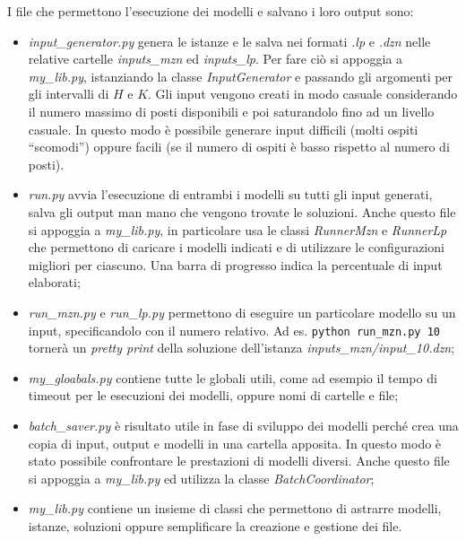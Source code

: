 \noindent
I file che permettono l'esecuzione dei modelli e salvano i loro output sono:
\begin{itemize}
  \item \emph{input\_generator.py} genera le istanze e le salva nei formati \emph{.lp} e \emph{.dzn} nelle relative cartelle \emph{inputs\_mzn} ed \emph{inputs\_lp}.
    Per fare ciò si appoggia a \emph{my\_lib.py}, istanziando la classe \emph{InputGenerator} e passando gli argomenti per gli intervalli di $H$ e $K$.
    Gli input vengono creati in modo casuale considerando il numero massimo di posti disponibili e poi saturandolo fino ad un livello casuale.
    In questo modo è possibile generare input difficili (molti ospiti ``scomodi'') oppure facili (se il numero di ospiti è basso rispetto al numero di posti).

  \item \emph{run.py} avvia l'esecuzione di entrambi i modelli su tutti gli input generati, salva gli output man mano che vengono trovate le soluzioni.
    Anche questo file si appoggia a \emph{my\_lib.py}, in particolare usa le classi \emph{RunnerMzn} e \emph{RunnerLp} che permettono di caricare i modelli indicati e di utilizzare le configurazioni migliori per ciascuno.
    Una barra di progresso indica la percentuale di input elaborati;

  \item \emph{run\_mzn.py} e \emph{run\_lp.py} permettono di eseguire un particolare modello su un input, specificandolo con il numero relativo. Ad es. \lstinline{python run_mzn.py 10} tornerà un \emph{pretty print} della soluzione dell'istanza \emph{inputs\_mzn/input\_10.dzn};

  \item \emph{my\_gloabals.py} contiene tutte le globali utili, come ad esempio il tempo di timeout per le esecuzioni dei modelli, oppure nomi di cartelle e file;

  \item \emph{batch\_saver.py} è risultato utile in fase di sviluppo dei modelli perché crea una copia di input, output e modelli in una cartella apposita.
  In questo modo è stato possibile confrontare le prestazioni di modelli diversi.
  Anche questo file si appoggia a \emph{my\_lib.py} ed utilizza la classe \emph{BatchCoordinator};

  \item \emph{my\_lib.py} contiene un insieme di classi che permettono di astrarre modelli, istanze, soluzioni oppure semplificare la creazione e gestione dei file.
\end{itemize}

